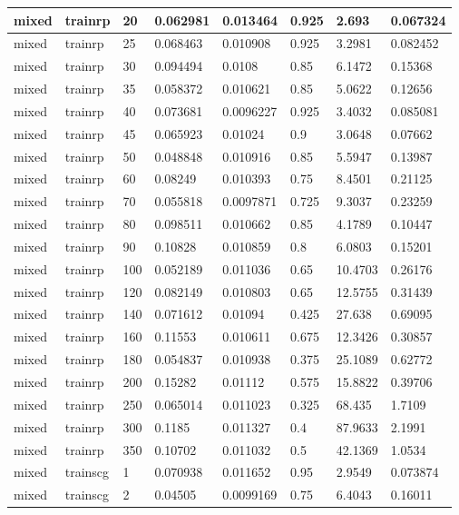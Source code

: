 \begin{longtable}{llllllll}
mixed & trainrp & 20 & 0.062981 & 0.013464 & 0.925 & 2.693 & 0.067324 \\ \hline 
mixed & trainrp & 25 & 0.068463 & 0.010908 & 0.925 & 3.2981 & 0.082452 \\ \hline 
mixed & trainrp & 30 & 0.094494 & 0.0108 & 0.85 & 6.1472 & 0.15368 \\ \hline 
mixed & trainrp & 35 & 0.058372 & 0.010621 & 0.85 & 5.0622 & 0.12656 \\ \hline 
mixed & trainrp & 40 & 0.073681 & 0.0096227 & 0.925 & 3.4032 & 0.085081 \\ \hline 
mixed & trainrp & 45 & 0.065923 & 0.01024 & 0.9 & 3.0648 & 0.07662 \\ \hline 
mixed & trainrp & 50 & 0.048848 & 0.010916 & 0.85 & 5.5947 & 0.13987 \\ \hline 
mixed & trainrp & 60 & 0.08249 & 0.010393 & 0.75 & 8.4501 & 0.21125 \\ \hline 
mixed & trainrp & 70 & 0.055818 & 0.0097871 & 0.725 & 9.3037 & 0.23259 \\ \hline 
mixed & trainrp & 80 & 0.098511 & 0.010662 & 0.85 & 4.1789 & 0.10447 \\ \hline 
mixed & trainrp & 90 & 0.10828 & 0.010859 & 0.8 & 6.0803 & 0.15201 \\ \hline 
mixed & trainrp & 100 & 0.052189 & 0.011036 & 0.65 & 10.4703 & 0.26176 \\ \hline 
mixed & trainrp & 120 & 0.082149 & 0.010803 & 0.65 & 12.5755 & 0.31439 \\ \hline 
mixed & trainrp & 140 & 0.071612 & 0.01094 & 0.425 & 27.638 & 0.69095 \\ \hline 
mixed & trainrp & 160 & 0.11553 & 0.010611 & 0.675 & 12.3426 & 0.30857 \\ \hline 
mixed & trainrp & 180 & 0.054837 & 0.010938 & 0.375 & 25.1089 & 0.62772 \\ \hline 
mixed & trainrp & 200 & 0.15282 & 0.01112 & 0.575 & 15.8822 & 0.39706 \\ \hline 
mixed & trainrp & 250 & 0.065014 & 0.011023 & 0.325 & 68.435 & 1.7109 \\ \hline 
mixed & trainrp & 300 & 0.1185 & 0.011327 & 0.4 & 87.9633 & 2.1991 \\ \hline 
mixed & trainrp & 350 & 0.10702 & 0.011032 & 0.5 & 42.1369 & 1.0534 \\ \hline 
mixed & trainscg & 1 & 0.070938 & 0.011652 & 0.95 & 2.9549 & 0.073874 \\ \hline 
mixed & trainscg & 2 & 0.04505 & 0.0099169 & 0.75 & 6.4043 & 0.16011 \\ \hline 

\end{longtable}
